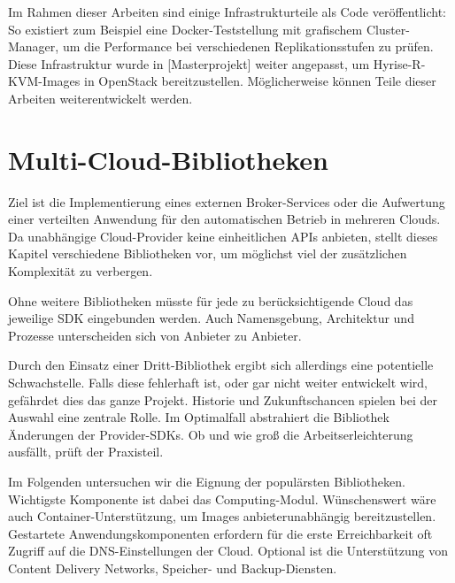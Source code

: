 Im Rahmen dieser Arbeiten sind einige Infrastrukturteile als Code veröffentlicht: So existiert zum Beispiel eine Docker-Teststellung mit grafischem Cluster-Manager, um die Performance bei verschiedenen Replikationsstufen zu prüfen. Diese Infrastruktur wurde in [Masterprojekt] weiter angepasst, um Hyrise-R-KVM-Images in OpenStack bereitzustellen. Möglicherweise können Teile dieser Arbeiten weiterentwickelt werden.


\section{Multi-Cloud-Bibliotheken}
\label{sec:bibliotheken}

Ziel ist die Implementierung eines externen Broker-Services oder die Aufwertung einer verteilten Anwendung für den automatischen Betrieb in mehreren Clouds. Da unabhängige Cloud-Provider keine einheitlichen APIs anbieten, stellt dieses Kapitel verschiedene Bibliotheken vor, um möglichst viel der zusätzlichen Komplexität zu verbergen.

Ohne weitere Bibliotheken müsste für jede zu berücksichtigende Cloud das jeweilige SDK eingebunden werden. Auch Namensgebung, Architektur und Prozesse unterscheiden sich von Anbieter zu Anbieter. 

Durch den Einsatz einer Dritt-Bibliothek ergibt sich allerdings eine potentielle Schwachstelle. Falls diese fehlerhaft ist, oder gar nicht weiter entwickelt wird, gefährdet dies das ganze Projekt. Historie und Zukunftschancen spielen bei der Auswahl eine zentrale Rolle. Im Optimalfall abstrahiert die Bibliothek Änderungen der Provider-SDKs. Ob und wie groß die Arbeitserleichterung ausfällt, prüft der Praxisteil.

Im Folgenden untersuchen wir die Eignung der populärsten Bibliotheken. Wichtigste Komponente ist dabei das Computing-Modul. Wünschenswert wäre auch Container-Unterstützung, um Images anbieterunabhängig bereitzustellen. Gestartete Anwendungskomponenten erfordern für die erste Erreichbarkeit oft Zugriff auf die DNS-Einstellungen der Cloud. Optional ist die Unterstützung von Content Delivery Networks, Speicher- und Backup-Diensten.

